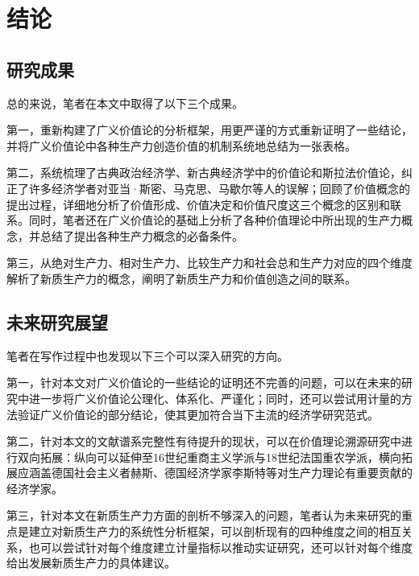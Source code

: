 
\chapter{结论}

\section{研究成果}

总的来说，笔者在本文中取得了以下三个成果。

第一，重新构建了广义价值论的分析框架，用更严谨的方式重新证明了一些结论，并将广义价值论中各种生产力创造价值的机制系统地总结为一张表格。

第二，系统梳理了古典政治经济学、新古典经济学中的价值论和斯拉法价值论，纠正了许多经济学者对亚当·斯密、马克思、马歇尔等人的误解；回顾了价值概念的提出过程，详细地分析了价值形成、价值决定和价值尺度这三个概念的区别和联系。同时，笔者还在广义价值论的基础上分析了各种价值理论中所出现的生产力概念，并总结了提出各种生产力概念的必备条件。

第三，从绝对生产力、相对生产力、比较生产力和社会总和生产力对应的四个维度解析了新质生产力的概念，阐明了新质生产力和价值创造之间的联系。

\section{未来研究展望}

笔者在写作过程中也发现以下三个可以深入研究的方向。

第一，针对本文对广义价值论的一些结论的证明还不完善的问题，可以在未来的研究中进一步将广义价值论公理化、体系化、严谨化；同时，还可以尝试用计量的方法验证广义价值论的部分结论，使其更加符合当下主流的经济学研究范式。

第二，针对本文的文献谱系完整性有待提升的现状，可以在价值理论溯源研究中进行双向拓展：纵向可以延伸至16世纪重商主义学派与18世纪法国重农学派，横向拓展应涵盖德国社会主义者赫斯、德国经济学家李斯特\cite[33]{YangQiaoYuShengChanLiGaiNianCongSiMiDaoMaKeSiDeSiXiangPuXi2013}等对生产力理论有重要贡献的经济学家。

第三，针对本文在新质生产力方面的剖析不够深入的问题，笔者认为未来研究的重点是建立对新质生产力的系统性分析框架，可以剖析现有的四种维度之间的相互关系，也可以尝试针对每个维度建立计量指标以推动实证研究，还可以针对每个维度给出发展新质生产力的具体建议。
